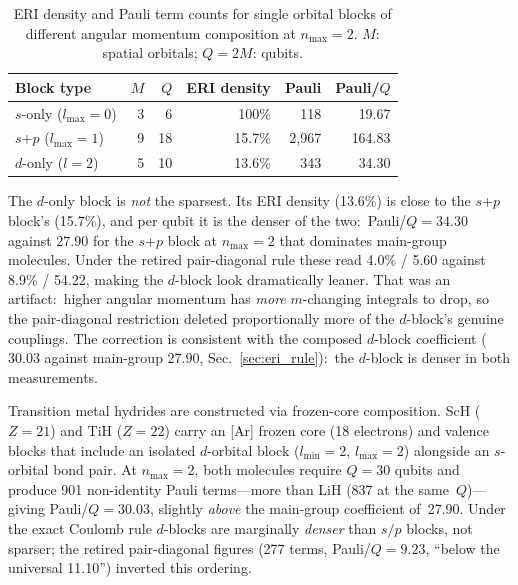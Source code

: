 \documentclass[aps,pra,twocolumn,superscriptaddress,longbibliography]{revtex4-2}
\newcommand{\gvq}[2]{#2}
\begin{document}
\begin{table}[t]
\caption{ERI density and Pauli term counts for single orbital blocks
  of different angular momentum composition at $n_{\max} = 2$.
  $M$: spatial orbitals; $Q = 2M$: qubits.}
\label{tab:d_block_eri}
\begin{ruledtabular}
\begin{tabular}{lrrrrr}
Block type & $M$ & $Q$ & ERI density & Pauli & Pauli/$Q$ \\
\hline
$s$-only ($l_{\max} = 0$) & 3 & 6 & 100\% & 118 & 19.67 \\
$s$+$p$ ($l_{\max} = 1$) & 9 & 18 & 15.7\% & 2{,}967 & 164.83 \\
$d$-only ($l = 2$) & 5 & 10 & 13.6\% & 343 & 34.30 \\
\end{tabular}
\end{ruledtabular}
\end{table}

The $d$-only block is \emph{not} the sparsest.  Its ERI density
(13.6\%) is close to the $s$+$p$ block's (15.7\%), and per qubit it is
the denser of the two:\ Pauli/$Q = 34.30$ against $\gvq{composed_coeff}{27.90}$ for the
$s$+$p$ block at $n_{\max}=2$ that dominates main-group molecules.
Under the retired pair-diagonal rule these read 4.0\% / 5.60 against
8.9\% / 54.22, making the $d$-block look dramatically leaner.  That was
an artifact:\ higher angular momentum has \emph{more} $m$-changing
integrals to drop, so the pair-diagonal restriction deleted
proportionally more of the $d$-block's genuine couplings.  The
correction is consistent with the composed $d$-block coefficient
($30.03$ against main-group $27.90$, Sec.~\ref{sec:eri_rule}):\ the
$d$-block is denser in both measurements.

Transition metal hydrides are constructed via frozen-core
composition.  ScH ($Z = 21$) and TiH ($Z = 22$) carry
an [Ar] frozen core (18 electrons) and valence blocks that include an
isolated $d$-orbital block ($l_{\min} = 2$, $l_{\max} = 2$) alongside
an $s$-orbital bond pair.  At $n_{\max} = 2$, both molecules require
$Q = 30$ qubits and produce 901 non-identity Pauli terms---more than
LiH ($\gvq{lih_composed_pauli}{837}$ at the same~$Q$)---giving Pauli/$Q = \gvq{composed_coeff_d}{30.03}$, slightly
\emph{above} the main-group coefficient of~27.90.  Under the exact
Coulomb rule $d$-blocks are marginally \emph{denser} than $s/p$
blocks, not sparser; the retired pair-diagonal figures (277 terms,
Pauli/$Q = 9.23$, ``below the universal 11.10'') inverted this
ordering.
\end{document}
